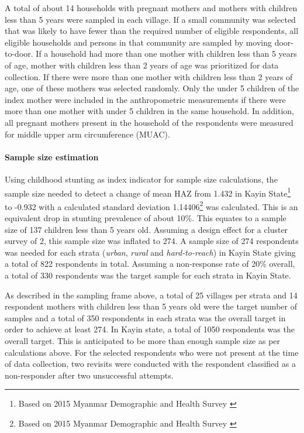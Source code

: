 \documentclass[12pt,a4paper]{article}
\let\oldparagraph\paragraph
\renewcommand{\paragraph}[1]{\oldparagraph{#1}\mbox{}}
\let\rmarkdownfootnote\footnote%
\def\footnote{\protect\rmarkdownfootnote}
\begin{document}
A total of about 14 households with pregnant mothers and mothers with children less than 5 years were sampled in each village. If a small community was selected that was likely to have fewer than the required number of eligible respondents, all eligible households and persons in that community are sampled by moving door-to-door. If a household had more than one mother with children less than 5 years of age, mother with children less than 2 years of age was prioritized for data collection. If there were more than one mother with children less than 2 years of age, one of these mothers was selected randomly. Only the under 5 children of the index mother were included in the anthropometric measurements if there were more than one mother with under 5 children in the same household. In addition, all pregnant mothers present in the household of the respondents were measured for middle upper arm circumference (MUAC).

\hypertarget{sample-size-1}{%
\paragraph{Sample size estimation}\label{sample-size-1}}

Using childhood stunting as index indicator for sample size calculations, the sample size needed to detect a change of mean HAZ from 1.432 in Kayin State\footnote{Based on 2015 Myanmar Demographic and Health Survey \citep{MinistryofHealthandSports-MoHS/Myanmar2017}} to -0.932 with a calculated standard deviation 1.14406\footnote{Based on 2015 Myanmar Demographic and Health Survey \citep{MinistryofHealthandSports-MoHS/Myanmar2017}} was calculated. This is an equivalent drop in stunting prevalence of about 10\%. This equates to a sample size of 137 children less than 5 years old. Assuming a design effect for a cluster survey of 2, this sample size was inflated to 274. A sample size of 274 respondents was needed for each strata (\emph{urban}, \emph{rural} and \emph{hard-to-reach}) in Kayin State giving a total of 822 respondents in total. Assuming a non-response rate of 20\% overall, a total of 330 respondents was the target sample for each strata in Kayin State.

As described in the sampling frame above, a total of 25 villages per strata and 14 respondent mothers with children less than 5 years old were the target number of samples and a total of 350 respondents in each strata was the overall target in order to achieve at least 274. In Kayin state, a total of 1050 respondents was the overall target. This is anticipated to be more than enough sample size as per calculations above. For the selected respondents who were not present at the time of data collection, two revisits were conducted with the respondent classified as a non-responder after two unsuccessful attempts.
\end{document}
